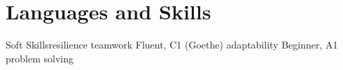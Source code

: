 \section{Languages and Skills}
                  {Soft Skills}{resilience}
         {}           {teamwork}
 {Fluent, C1 (Goethe)}            {}           {adaptability}
 {Beginner, A1}                   {}           {problem solving}

